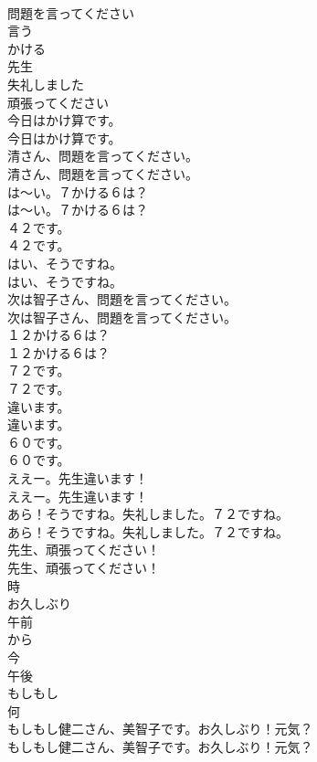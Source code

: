 \documentclass[8pt]{extreport}
\begin{document}
\begin{CJK}{UTF8}{min}
\\	問題を言ってください
\\	言う
\\	かける
\\	先生
\\	失礼しました
\\	頑張ってください
\\	今日はかけ算です。	
\\	今日はかけ算です。 
\\	清さん、問題を言ってください。	
\\	清さん、問題を言ってください。 
\\	は〜い。７かける６は？	
\\	は〜い。７かける６は？ 
\\	４２です。	
\\	４２です。 
\\	はい、そうですね。	
\\	はい、そうですね。 
\\	次は智子さん、問題を言ってください。	
\\	次は智子さん、問題を言ってください。 
\\	１２かける６は？	
\\	１２かける６は？ 
\\	７２です。	
\\	７２です。 
\\	違います。	
\\	違います。 
\\	６０です。	
\\	６０です。 
\\	ええー。先生違います！	
\\	ええー。先生違います！ 
\\	あら！そうですね。失礼しました。７２ですね。	
\\	あら！そうですね。失礼しました。７２ですね。 
\\	先生、頑張ってください！	
\\	先生、頑張ってください！ 
\\	時
\\	お久しぶり
\\	午前
\\	から
\\	今
\\	午後
\\	もしもし
\\	何
\\	もしもし健二さん、美智子です。お久しぶり！元気？	
\\	もしもし健二さん、美智子です。お久しぶり！元気？ 

\end{CJK}
\end{document}
